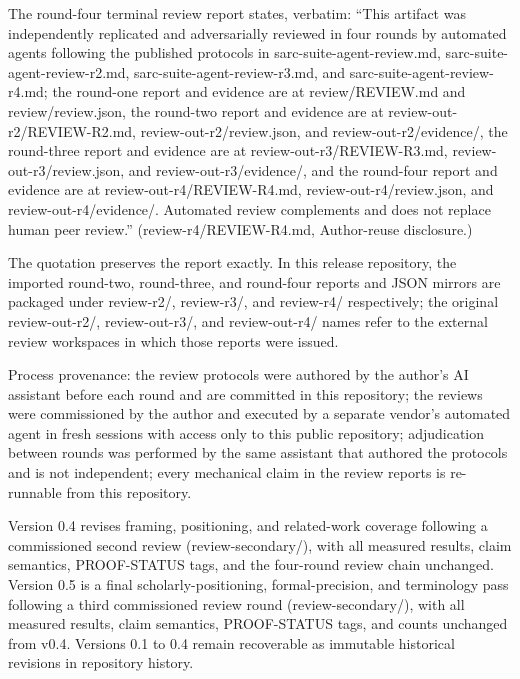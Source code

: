 \documentclass[11pt,a4paper]{article}
\theoremstyle{definition}
\begin{document}
The round-four terminal review report states, verbatim: ``This artifact was independently replicated and adversarially reviewed in four rounds by automated agents following the published protocols in \mbox{sarc-suite-agent-review.md}, \mbox{sarc-suite-agent-review-r2.md}, \mbox{sarc-suite-agent-review-r3.md}, and \mbox{sarc-suite-agent-review-r4.md}; the round-one report and evidence are at \mbox{review/REVIEW.md} and \mbox{review/review.json}, the round-two report and evidence are at \mbox{review-out-r2/REVIEW-R2.md}, \mbox{review-out-r2/review.json}, and \mbox{review-out-r2/evidence/}, the round-three report and evidence are at \mbox{review-out-r3/REVIEW-R3.md}, \mbox{review-out-r3/review.json}, and \mbox{review-out-r3/evidence/}, and the round-four report and evidence are at \mbox{review-out-r4/REVIEW-R4.md}, \mbox{review-out-r4/review.json}, and \mbox{review-out-r4/evidence/}. Automated review complements and does not replace human peer review.'' (\mbox{review-r4/REVIEW-R4.md}, Author-reuse disclosure.)

The quotation preserves the report exactly. In this release repository, the imported round-two, round-three, and round-four reports and JSON mirrors are packaged under \mbox{review-r2/}, \mbox{review-r3/}, and \mbox{review-r4/} respectively; the original \mbox{review-out-r2/}, \mbox{review-out-r3/}, and \mbox{review-out-r4/} names refer to the external review workspaces in which those reports were issued.

Process provenance: the review protocols were authored by the author's AI assistant before each round and are committed in this repository; the reviews were commissioned by the author and executed by a separate vendor's automated agent in fresh sessions with access only to this public repository; adjudication between rounds was performed by the same assistant that authored the protocols and is not independent; every mechanical claim in the review reports is re-runnable from this repository.

Version 0.4 revises framing, positioning, and related-work coverage following a commissioned second review (review-secondary/), with all measured results, claim semantics, PROOF-STATUS tags, and the four-round review chain unchanged. Version 0.5 is a final scholarly-positioning, formal-precision, and terminology pass following a third commissioned review round (review-secondary/), with all measured results, claim semantics, PROOF-STATUS tags, and counts unchanged from v0.4. Versions 0.1 to 0.4 remain recoverable as immutable historical revisions in repository history.
\end{document}
